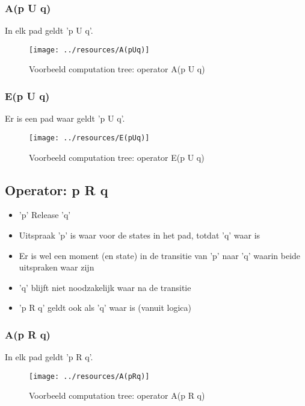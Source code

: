 \documentclass{article}
\begin{document}
      \subsubsection{A(p U q)}
        In elk pad geldt 'p U q'.
        \begin{figure}[h]
          \centering
          \texttt{[image: ../resources/A(pUq)]}
          \caption{Voorbeeld computation tree: operator A(p U q)}
          \label{fig:apug}
        \end{figure}

      \subsubsection{E(p U q)}
        Er is een pad waar geldt 'p U q'.
        \begin{figure}[h]
          \centering
          \texttt{[image: ../resources/E(pUq)]}
          \caption{Voorbeeld computation tree: operator E(p U q)}
          \label{fig:epug}
        \end{figure}



  \subsection{Operator: p R q}
    \begin{itemize}
      \item 'p' Release 'q'
      \item Uitspraak 'p' is waar voor de states in het pad, totdat 'q' waar is
      \item Er is wel een moment (en state) in de transitie van 'p' naar 'q' waarin beide uitspraken waar zijn
      \item 'q' blijft niet noodzakelijk waar na de transitie
      \item 'p R q' geldt ook als 'q' waar is (vanuit logica)
    \end{itemize}

      \subsubsection{A(p R q)}
        In elk pad geldt 'p R q'.
        \begin{figure}[h]
          \centering
          \texttt{[image: ../resources/A(pRq)]}
          \caption{Voorbeeld computation tree: operator A(p R q)}
          \label{fig:aprq}
        \end{figure}
\end{document}
